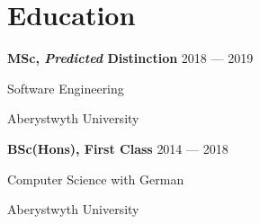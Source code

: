 \section{Education}
\parbox[t][][t]{\linewidth}{
	\parbox{\linewidth}{\textbf{MSc, \textit{Predicted} Distinction} \hfill {{2018 --- 2019}}}
	\parbox{\linewidth}{{Software Engineering}}
	\parbox{\linewidth}{{Aberystwyth University}}
	\smallskip
}

\parbox[t][][t]{\linewidth}{
	\parbox{\linewidth}{\textbf{BSc(Hons), First Class} \hfill {{2014 --- 2018}}}
	\parbox{\linewidth}{{Computer Science with German}}
	\parbox{\linewidth}{{Aberystwyth University}}
	\smallskip
}

